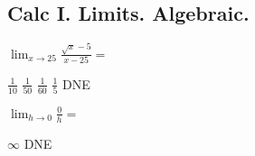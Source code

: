 \documentclass[addpoints]{exam}
\begin{document}
\begin{questions}
\section{Calc I. Limits. Algebraic.}
\question $\lim_{x\to 25} \frac{\sqrt x-5}{x-25} = $
\begin{oneparcheckboxes}
	\correctchoice $\frac1{10}$
	\choice $\frac1{50}$ %
	\choice $\frac1{60}$
	\choice $\frac15$
	\choice DNE
	\end{oneparcheckboxes}
\question $\lim_{h\to0} \frac0h = $
\begin{oneparcheckboxes}
	\choice $\infty$
	\choice DNE
	\end{oneparcheckboxes}
\end{questions}
\end{document}
